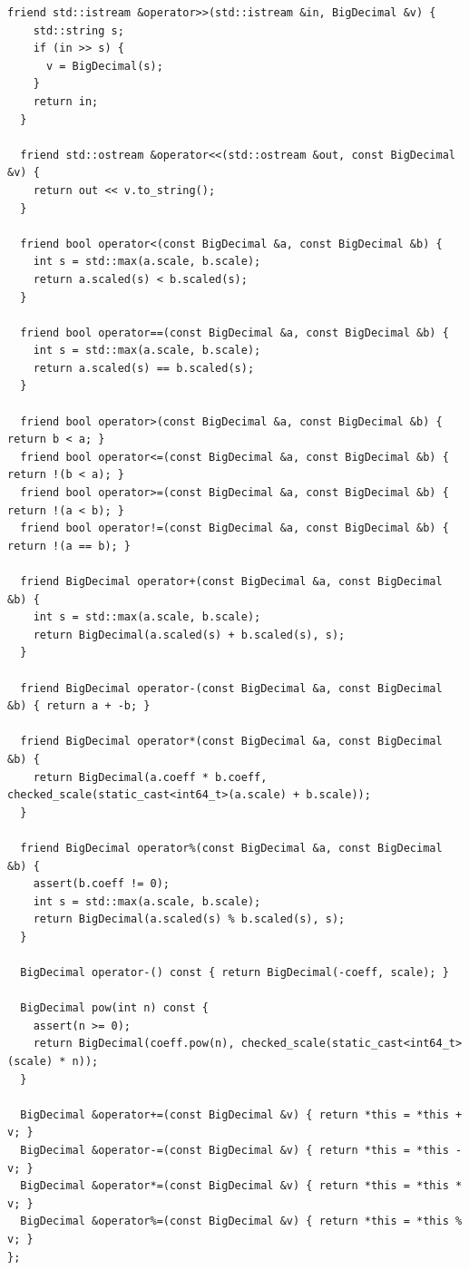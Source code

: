 \begin{lstlisting}[style=cpp]
  friend std::istream &operator>>(std::istream &in, BigDecimal &v) {
    std::string s;
    if (in >> s) {
      v = BigDecimal(s);
    }
    return in;
  }

  friend std::ostream &operator<<(std::ostream &out, const BigDecimal &v) {
    return out << v.to_string();
  }

  friend bool operator<(const BigDecimal &a, const BigDecimal &b) {
    int s = std::max(a.scale, b.scale);
    return a.scaled(s) < b.scaled(s);
  }

  friend bool operator==(const BigDecimal &a, const BigDecimal &b) {
    int s = std::max(a.scale, b.scale);
    return a.scaled(s) == b.scaled(s);
  }

  friend bool operator>(const BigDecimal &a, const BigDecimal &b) { return b < a; }
  friend bool operator<=(const BigDecimal &a, const BigDecimal &b) { return !(b < a); }
  friend bool operator>=(const BigDecimal &a, const BigDecimal &b) { return !(a < b); }
  friend bool operator!=(const BigDecimal &a, const BigDecimal &b) { return !(a == b); }

  friend BigDecimal operator+(const BigDecimal &a, const BigDecimal &b) {
    int s = std::max(a.scale, b.scale);
    return BigDecimal(a.scaled(s) + b.scaled(s), s);
  }

  friend BigDecimal operator-(const BigDecimal &a, const BigDecimal &b) { return a + -b; }

  friend BigDecimal operator*(const BigDecimal &a, const BigDecimal &b) {
    return BigDecimal(a.coeff * b.coeff, checked_scale(static_cast<int64_t>(a.scale) + b.scale));
  }

  friend BigDecimal operator%(const BigDecimal &a, const BigDecimal &b) {
    assert(b.coeff != 0);
    int s = std::max(a.scale, b.scale);
    return BigDecimal(a.scaled(s) % b.scaled(s), s);
  }

  BigDecimal operator-() const { return BigDecimal(-coeff, scale); }

  BigDecimal pow(int n) const {
    assert(n >= 0);
    return BigDecimal(coeff.pow(n), checked_scale(static_cast<int64_t>(scale) * n));
  }

  BigDecimal &operator+=(const BigDecimal &v) { return *this = *this + v; }
  BigDecimal &operator-=(const BigDecimal &v) { return *this = *this - v; }
  BigDecimal &operator*=(const BigDecimal &v) { return *this = *this * v; }
  BigDecimal &operator%=(const BigDecimal &v) { return *this = *this % v; }
};
\end{lstlisting}
